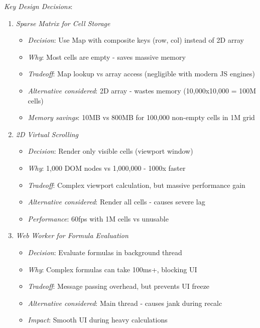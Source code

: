 \documentclass[11pt]{article}
\begin{document}
\emph{Key Design Decisions}:

\begin{enumerate}
\item \emph{Sparse Matrix for Cell Storage}

\begin{itemize}
\item \emph{Decision}: Use Map with composite keys (row, col) instead of 2D array
\item \emph{Why}: Most cells are empty - saves massive memory
\item \emph{Tradeoff}: Map lookup vs array access (negligible with modern JS engines)
\item \emph{Alternative considered}: 2D array - wastes memory (10,000x10,000 = 100M cells)
\item \emph{Memory savings}: 10MB vs 800MB for 100,000 non-empty cells in 1M grid
\end{itemize}

\item \emph{2D Virtual Scrolling}

\begin{itemize}
\item \emph{Decision}: Render only visible cells (viewport window)
\item \emph{Why}: 1,000 DOM nodes vs 1,000,000 - 1000x faster
\item \emph{Tradeoff}: Complex viewport calculation, but massive performance gain
\item \emph{Alternative considered}: Render all cells - causes severe lag
\item \emph{Performance}: 60fps with 1M cells vs unusable
\end{itemize}

\item \emph{Web Worker for Formula Evaluation}

\begin{itemize}
\item \emph{Decision}: Evaluate formulas in background thread
\item \emph{Why}: Complex formulas can take 100ms+, blocking UI
\item \emph{Tradeoff}: Message passing overhead, but prevents UI freeze
\item \emph{Alternative considered}: Main thread - causes jank during recalc
\item \emph{Impact}: Smooth UI during heavy calculations
\end{itemize}


\end{enumerate}
\end{document}

